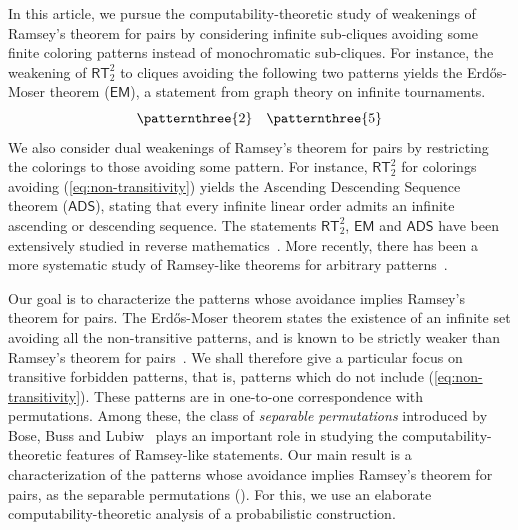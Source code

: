 \documentclass{article}
\numberwithin{theorem}{section}
\newcommand{\ADS}[0]{\mathsf{ADS}}
\newcommand{\EM}[0]{\mathsf{EM}}
\newcommand{\RT}[0]{\mathsf{RT}}
\begin{document}
In this article, we pursue the computability-theoretic study of weakenings of Ramsey's theorem for pairs by considering infinite sub-cliques avoiding some finite coloring patterns instead of monochromatic sub-cliques. For instance, the weakening of $\RT^2_2$ to cliques avoiding the following two patterns yields the Erd\H{o}s-Moser theorem ($\EM$), a statement from graph theory on infinite tournaments.
\vspace{1cm}
\begin{equation}\label{eq:non-transitivity}
\patternthree{2} \hspace{10pt} \patternthree{5}
\end{equation}
We also consider dual weakenings of Ramsey's theorem for pairs by restricting the colorings to those avoiding some pattern. For instance, $\RT^2_2$ for colorings avoiding (\ref{eq:non-transitivity}) yields the Ascending Descending Sequence theorem ($\ADS$), stating that every infinite linear order admits an infinite ascending or descending sequence. The statements $\RT^2_2$, $\EM$ and $\ADS$ have been extensively studied in reverse mathematics~\cite{seetapun1995strength,cholak2001strength,hirschfeldt2007combinatorial,lerman2013separating}. More recently, there has been a more systematic study of Ramsey-like theorems for arbitrary patterns~\cite{patey2022ramseylike,cervelle2024reverse,mimouni2025ramseylike}.

Our goal is to characterize the patterns whose avoidance implies Ramsey's theorem for pairs. The Erd\H{o}s-Moser theorem states the existence of an infinite set avoiding all the non-transitive patterns, and is known to be strictly weaker than Ramsey's theorem for pairs~\cite{lerman2013separating}. We shall therefore give a particular focus on transitive forbidden patterns, that is, patterns which do not include (\ref{eq:non-transitivity}). These patterns are in one-to-one correspondence with permutations. Among these, the class of \emph{separable permutations} introduced by Bose, Buss and Lubiw~\cite{bose1998pattern} plays an important role in studying the computability-theoretic features of Ramsey-like statements. Our main result is a characterization of the patterns whose avoidance implies Ramsey's theorem for pairs, as the separable permutations (). For this, we use an elaborate computability-theoretic analysis of a probabilistic construction.

\end{document}

